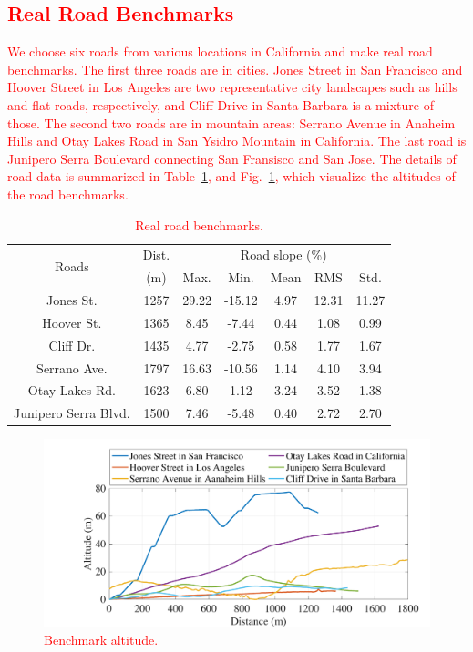 \documentclass{IEEEtran}
\begin{document}
\textcolor{red}{\subsection{Real Road Benchmarks}} \label{subsec:benchmarks}

\textcolor{red}{We choose six  roads from various locations in California and make real road benchmarks. The first three roads are in cities. Jones Street in San Francisco and Hoover Street in Los Angeles are two representative city landscapes such as hills and flat roads, respectively, and Cliff Drive in Santa Barbara is a mixture of those. The second two roads are in mountain areas: Serrano Avenue in Anaheim Hills and Otay Lakes Road in San Ysidro Mountain in California. The last road is Junipero Serra Boulevard connecting San Fransisco and San Jose. The details of road data is summarized in Table~\ref{table:road_bench}, and Fig.~\ref{fig:bench_altitude}, which visualize the altitudes of the road benchmarks.}

\begin{table} 
\caption{\textcolor{red}{Real road benchmarks.}}
\centering
\label{table:road_bench}
\begin{tabular}{|c|c|c|c|c|c|c|}  \hline
\multirow{2}{*}{Roads} 
				&Dist.		&\multicolumn{5}{|c|}{Road slope (\%)}  \\ \cline{3-7}
				&(m)		 	&Max.		&Min. 	&Mean		&RMS 	&Std.	\\ \hline
Jones St. 	&1257		&29.22		&-15.12	&4.97 		&12.31 	&11.27	\\ \hline
Hoover St. 	&1365		&8.45		&-7.44	&0.44		&1.08 	&0.99	\\ \hline
Cliff Dr. 	&1435		&4.77		&-2.75	&0.58		&1.77 	&1.67	\\ \hline
Serrano Ave.		&1797		&16.63		&-10.56	&1.14 		&4.10 	&3.94	\\ \hline
Otay Lakes Rd.		&1623		&6.80		&1.12	&3.24		&3.52 	&1.38	\\ \hline
Junipero Serra Blvd.	&1500		&7.46		&-5.48	&0.40		&2.72 	&2.70	\\ \hline
\end{tabular}
\end{table}


\begin{figure}	 %
\includegraphics[width=1.0\hsize]{Figures/Benchmark_altitude.pdf}
\caption{\textcolor{red}{Benchmark altitude.}}
\label{fig:bench_altitude}
\end{figure} 
\end{document}
